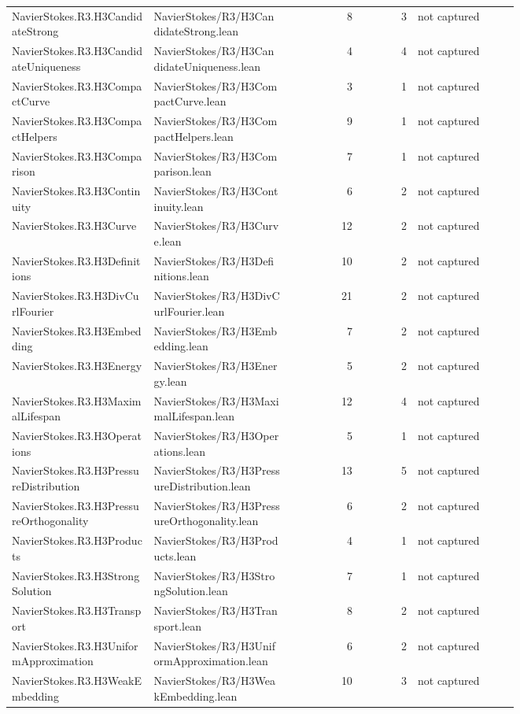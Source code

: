 \documentclass[10pt]{article}
\begin{document}
\begin{longtable}{p{0.28\linewidth}p{0.27\linewidth}r r p{0.20\linewidth}}
NavierStokes.R3.H3CandidateStrong & NavierStokes/R3/H3CandidateStrong.lean & 8 & 3 & not captured\\
NavierStokes.R3.H3CandidateUniqueness & NavierStokes/R3/H3CandidateUniqueness.lean & 4 & 4 & not captured\\
NavierStokes.R3.H3CompactCurve & NavierStokes/R3/H3CompactCurve.lean & 3 & 1 & not captured\\
NavierStokes.R3.H3CompactHelpers & NavierStokes/R3/H3CompactHelpers.lean & 9 & 1 & not captured\\
NavierStokes.R3.H3Comparison & NavierStokes/R3/H3Comparison.lean & 7 & 1 & not captured\\
NavierStokes.R3.H3Continuity & NavierStokes/R3/H3Continuity.lean & 6 & 2 & not captured\\
NavierStokes.R3.H3Curve & NavierStokes/R3/H3Curve.lean & 12 & 2 & not captured\\
NavierStokes.R3.H3Definitions & NavierStokes/R3/H3Definitions.lean & 10 & 2 & not captured\\
NavierStokes.R3.H3DivCurlFourier & NavierStokes/R3/H3DivCurlFourier.lean & 21 & 2 & not captured\\
NavierStokes.R3.H3Embedding & NavierStokes/R3/H3Embedding.lean & 7 & 2 & not captured\\
NavierStokes.R3.H3Energy & NavierStokes/R3/H3Energy.lean & 5 & 2 & not captured\\
NavierStokes.R3.H3MaximalLifespan & NavierStokes/R3/H3MaximalLifespan.lean & 12 & 4 & not captured\\
NavierStokes.R3.H3Operations & NavierStokes/R3/H3Operations.lean & 5 & 1 & not captured\\
NavierStokes.R3.H3PressureDistribution & NavierStokes/R3/H3PressureDistribution.lean & 13 & 5 & not captured\\
NavierStokes.R3.H3PressureOrthogonality & NavierStokes/R3/H3PressureOrthogonality.lean & 6 & 2 & not captured\\
NavierStokes.R3.H3Products & NavierStokes/R3/H3Products.lean & 4 & 1 & not captured\\
NavierStokes.R3.H3StrongSolution & NavierStokes/R3/H3StrongSolution.lean & 7 & 1 & not captured\\
NavierStokes.R3.H3Transport & NavierStokes/R3/H3Transport.lean & 8 & 2 & not captured\\
NavierStokes.R3.H3UniformApproximation & NavierStokes/R3/H3UniformApproximation.lean & 6 & 2 & not captured\\
NavierStokes.R3.H3WeakEmbedding & NavierStokes/R3/H3WeakEmbedding.lean & 10 & 3 & not captured\\

\end{longtable}
\end{document}
